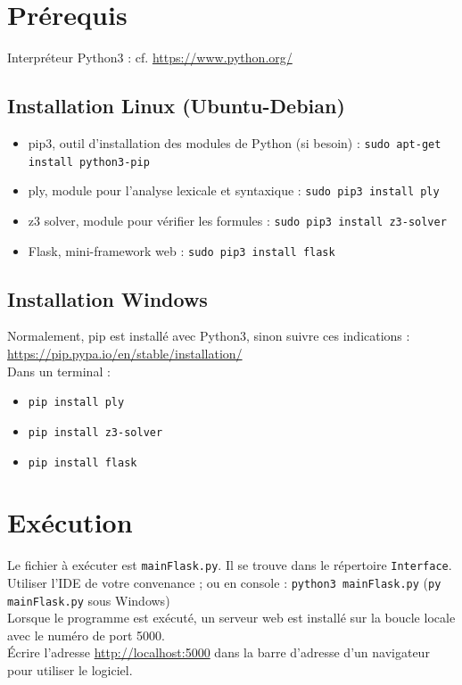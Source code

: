 \documentclass[11pt,a4paper]{article}
\begin{document}
\section{Prérequis}
Interpréteur Python3 : cf. \url{https://www.python.org/}
\subsection{Installation Linux (Ubuntu-Debian)}
  \begin{itemize}
	\item pip3, outil d’installation des modules de Python (si besoin) : \texttt{sudo apt-get install python3-pip}
	\item ply, module pour l’analyse lexicale et syntaxique : \texttt{sudo pip3 install ply}
	\item z3 solver, module pour vérifier les formules : \texttt{sudo pip3 install z3-solver}
	\item Flask, mini-framework web : \texttt{sudo pip3 install flask}
  \end{itemize}
\subsection{Installation Windows}
Normalement, pip est installé avec Python3, sinon suivre ces indications : \url{https://pip.pypa.io/en/stable/installation/}\\

Dans un terminal : 
 \begin{itemize}
 \item \texttt{pip install ply}

\item \texttt{pip install z3-solver}

\item \texttt{pip install flask}
  \end{itemize}

\section{Exécution}
Le fichier à exécuter est \texttt{mainFlask.py}. Il se trouve dans le répertoire \texttt{Interface}.\\
Utiliser l'IDE de votre convenance ; ou en console : \texttt{python3 mainFlask.py} (\texttt{py mainFlask.py} sous Windows)\\
Lorsque le programme est exécuté, un serveur web est installé sur la boucle locale avec le numéro de port 5000.\\
Écrire l’adresse \url{http://localhost:5000} dans la barre d’adresse d’un navigateur pour utiliser le logiciel.
\end{document}
